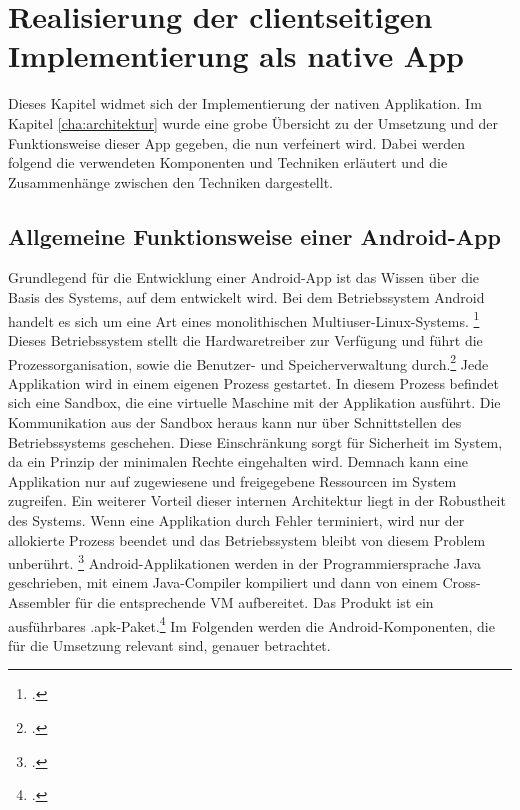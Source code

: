 \chapter{Realisierung der clientseitigen Implementierung als native App}
\label{cha:native-app}
Dieses Kapitel widmet sich der Implementierung der nativen Applikation. Im Kapitel \ref{cha:architektur} wurde eine grobe Übersicht zu der Umsetzung und der Funktionsweise dieser \ac{App} gegeben, die nun verfeinert wird.
Dabei werden folgend die verwendeten Komponenten und Techniken erläutert und die Zusammenhänge zwischen den Techniken dargestellt.
\section{Allgemeine Funktionsweise einer Android-App}
\label{sec:definition-android}
Grundlegend für die Entwicklung einer Android-App ist das Wissen über die Basis des Systems, auf dem entwickelt wird. 
Bei dem Betriebssystem \ac{Android} handelt es sich um eine Art eines \ac{monolithisch}en Multiuser-\ac{Linux}-Systems. \footcite{Android-Fundamentals}
Dieses Betriebssystem stellt die Hardwaretreiber zur Verfügung und führt die Prozessorganisation, sowie die Benutzer- und Speicherverwaltung durch.\footcite[S. 19ff.]{Android-BeckerPant}
Jede Applikation wird in einem eigenen Prozess gestartet. In diesem Prozess befindet sich eine \ac{Sandbox}, die eine virtuelle Maschine mit der Applikation ausführt. Die Kommunikation aus der Sandbox heraus kann nur über Schnittstellen des Betriebssystems geschehen. Diese Einschränkung sorgt für Sicherheit im System, da ein Prinzip der minimalen Rechte eingehalten wird. Demnach kann eine Applikation nur auf zugewiesene und freigegebene Ressourcen im System zugreifen. Ein weiterer Vorteil dieser internen Architektur liegt in der Robustheit des Systems. Wenn eine Applikation durch Fehler terminiert, wird nur der allokierte Prozess beendet und das Betriebssystem bleibt von diesem Problem unberührt. \footcite{Android-SystemPermissions}
Android-Applikationen werden in der Programmiersprache \ac{Java} geschrieben, mit einem Java-\ac{Compiler} kompiliert und dann von einem Cross-Assembler für die entsprechende \ac{VM} aufbereitet. Das Produkt ist ein ausführbares \ac{.apk}-Paket.\footcite{Android-Fundamentals}
Im Folgenden werden die Android-Komponenten, die für die Umsetzung relevant sind, genauer betrachtet.
